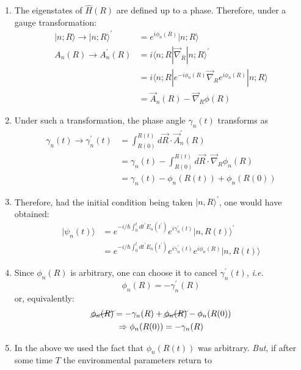 \documentclass[12pt]{article}
\newcommand{\be}{\begin{equation}}
\newcommand{\ee}{\end{equation}}
\begin{document}
\begin{enumerate}
\item The eigenstates of $\hat{H}(R)$ are defined up to
a phase. Therefore, under a gauge transformation:
\be
\begin{aligned}
|n ; R\rangle \rightarrow|n ; R\rangle^{\prime} 
&=e^{i \phi_{n}(R)}|n ; R\rangle \\
A_{n}(R) \rightarrow A_{n}^{\prime}(R) 
&=i\langle n ; R| \vec{\nabla}_{\!R} |n ; R\rangle^{\prime} \\ 
&=i\langle n ; R| e^{-i \phi_{n}(R)} \vec{\nabla}_{\!R}  e^{i \phi_{n}(R)}|n ; R\rangle\\ 
&=\vec{A}_{n}(R)-\vec{\nabla}_{\!R}  \phi(R) 
\end{aligned}
\ee
%
\item Under such a transformation, the phase angle $\gamma_{n}(t)$
transforms as
\be
\begin{aligned} 
\gamma_{n}(t) \rightarrow \gamma_{n}^{\prime}(t) 
&=\int_{R(0)}^{R(t)} d \vec{R} \cdot \vec{A}_{n}^{\prime}(R) \\ 
&=\gamma_{n}(t)-\int_{R(0)}^{R(t)} d \vec{R} \cdot \vec{\nabla}_{\!R}  \phi_{n}(R) \\
&=\gamma_{n}(t)-\phi_{n}(R(t))+\phi_{n}(R(0))
\end{aligned}
\ee
%
\item Therefore, had the initial condition being
taken $|n, R\rangle^{\prime}$, one would have obtained:
\be
\begin{aligned} 
|\psi_{n}(t)\rangle
&=e^{-i / \hbar \int_{0}^{t} d t^{\prime} E_{n}\left(t^{\prime}\right)} e^{i \gamma_{n}^{\prime}(t)}|n, R(t)\rangle^{\prime}\\
&=e^{-i / \hbar \int_{0}^{t} d t^{\prime} E_{n}\left(t^{\prime}\right)} e^{i \gamma_{n}^{\prime}(t)}e^{i\phi_n(R)}|n, R(t)\rangle
\end{aligned} 
\ee
%
\item Since $\phi_{n}(R)$ is arbitrary, one can choose it
to cancel $\gamma_{n}^{\prime}(t)$, \textit{i.e.}
\be
\phi_{n}(R)=-\gamma_{n}^{\prime}(R)
\ee
or, equivalently:
\be
\begin{gathered}
\cancel{\phi_{n}(R)}=-\gamma_{n}(R)+\cancel{\phi_{n}(R)}-\phi_{n}(R(0))\\
\Rightarrow \phi_{n}(R(0))=-\gamma_{n}(R)
\end{gathered}
\ee
%
\item In the above we used the fact that
$\phi_{n}(R(t))$ was arbitrary. \emph{But}, if after some
time $T$ the environmental parameters return to

\end{enumerate}
\end{document}
